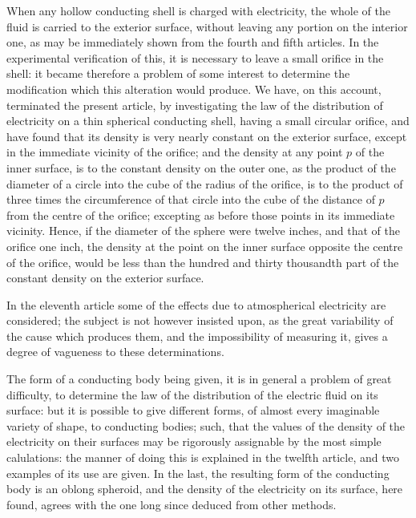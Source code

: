 \documentclass[12pt,notitlepage]{amsart}
\begin{document}
When any hollow conducting shell is charged with electricity, the whole
of the fluid is carried to the exterior surface,
without leaving any portion on
the interior one, as may be immediately shown
from the fourth and fifth articles.
In the experimental verification of this,
it is necessary to leave a small orifice
in the shell: it became therefore a problem of some interest to determine the
modification which this alteration would produce. We have, on this account,
terminated the present article,
by investigating the law of the distribution of
electricity on a thin spherical conducting shell,
having a small circular orifice,
and have found that its density is
very nearly constant on the exterior surface,
except in the immediate vicinity of the orifice; and the density at any
point $p$ of the inner surface, is to the constant density on the outer one, as
the product of the diameter of a circle
into the cube of the radius of the orifice,
is to the product of three times the circumference of that circle into the cube
of the distance of $p$ from the centre of the orifice; excepting as before those
points in its immediate vicinity. Hence, if the diameter of the sphere were
twelve inches, and that of the orifice one inch, the density at the point
on the inner surface opposite the centre of the orifice, would be less than
the hundred and thirty thousandth part of the constant density on the exterior
surface.

In the eleventh article some of the effects due to atmospherical electricity
are considered; the subject is not however insisted upon, as the great
variability of the cause which produces them, and the impossibility of measuring
it, gives a degree of vagueness to these determinations.

The form of a conducting body being given, it is in general a problem
of great difficulty,
to determine the law of the distribution of the electric fluid
on its surface: but it is possible to give different forms, of almost every 
imaginable variety of shape, to conducting bodies; such, that the values of the
density of the electricity on their surfaces may be rigorously assignable by
the most simple calulations:
the manner of doing this is explained in the twelfth
article, and two examples of its use are given. In the last, the resulting form
of the conducting body is an oblong spheroid, and the density of the 
electricity on its surface, here found,
agrees with the one long since deduced from
other methods.
\end{document}
